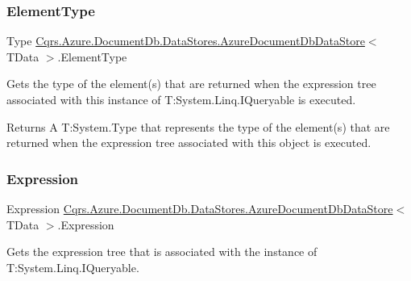 \subsubsection{\texorpdfstring{Element\+Type}{ElementType}}
{\footnotesize\ttfamily Type \hyperlink{classCqrs_1_1Azure_1_1DocumentDb_1_1DataStores_1_1AzureDocumentDbDataStore}{Cqrs.\+Azure.\+Document\+Db.\+Data\+Stores.\+Azure\+Document\+Db\+Data\+Store}$<$ T\+Data $>$.Element\+Type\hspace{0.3cm}{\ttfamily [get]}}



Gets the type of the element(s) that are returned when the expression tree associated with this instance of T\+:\+System.\+Linq.\+I\+Queryable is executed. 

\begin{DoxyReturn}{Returns}
A T\+:\+System.\+Type that represents the type of the element(s) that are returned when the expression tree associated with this object is executed. 
\end{DoxyReturn}
\mbox{\label{classCqrs_1_1Azure_1_1DocumentDb_1_1DataStores_1_1AzureDocumentDbDataStore_a47d5ae1b47f4166210d1caab58467529_a47d5ae1b47f4166210d1caab58467529}} 
\subsubsection{\texorpdfstring{Expression}{Expression}}
{\footnotesize\ttfamily Expression \hyperlink{classCqrs_1_1Azure_1_1DocumentDb_1_1DataStores_1_1AzureDocumentDbDataStore}{Cqrs.\+Azure.\+Document\+Db.\+Data\+Stores.\+Azure\+Document\+Db\+Data\+Store}$<$ T\+Data $>$.Expression\hspace{0.3cm}{\ttfamily [get]}}



Gets the expression tree that is associated with the instance of T\+:\+System.\+Linq.\+I\+Queryable. 

